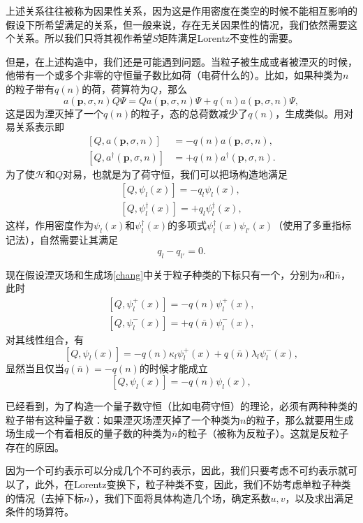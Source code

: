 \documentclass[9pt]{extbook}
\theoremstyle{plain}%
\begin{document}
上述关系往往被称为因果性关系，因为这是作用密度在类空的时候不能相互影响的假设下所希望满足的关系，但一般来说，存在无关因果性的情况，我们依然需要这个关系。所以我们只将其视作希望$S$矩阵满足Lorentz不变性的需要。

但是，在上述构造中，我们还是可能遇到问题。当粒子被生成或者被湮灭的时候，他带有一个或多个非零的守恒量子数比如荷（电荷什么的）。比如，如果种类为$n$的粒子带有$q(n)$的荷，荷算符为$Q$，那么
\[
	a(\mathbf{p},\sigma,n)Q\Psi=Qa(\mathbf{p},\sigma,n)\Psi+q(n)a(\mathbf{p},\sigma,n)\Psi,
\]
这是因为湮灭掉了一个$q(n)$的粒子，态的总荷数减少了$q(n)$，生成类似。用对易关系表示即
\[
\begin{split}
	[Q,a(\mathbf{p},\sigma,n)]&=-q(n)a(\mathbf{p},\sigma,n),\\
	[Q,a^\dag(\mathbf{p},\sigma,n)]&=+q(n)a^\dag(\mathbf{p},\sigma,n).
\end{split}
\]
为了使$\mathscr{H}$和$Q$对易，也就是为了荷守恒，我们可以把场构造地满足
\[
\begin{split}
	[Q,\psi_l(x)]=-q_l\psi_l(x),\\
	[Q,\psi^\dag_l(x)]=+q_l\psi^\dag_l(x),
\end{split}
\]
这样，作用密度作为$\psi_l(x)$和$\psi^\dag_l(x)$的多项式$\psi^\dag_l(x)\psi_{l'}(x)$（使用了多重指标记法），自然需要让其满足
\[
	q_{l}-q_{l'}=0.
\]

现在假设湮灭场和生成场\eqref{chang}中关于粒子种类的下标只有一个，分别为$n$和$\bar{n}$，此时
\[
\begin{split}
	[Q,\psi^+_l(x)]=-q(n)\psi^+_l(x),\\
	[Q,\psi^-_l(x)]=+q(\bar{n})\psi^-_l(x),
\end{split}
\]
对其线性组合，有
\[
	[Q,\psi_l(x)]=-q(n)\kappa_l\psi_l^+(x)+q(\bar{n})\lambda_l\psi_l^-(x),
\]
显然当且仅当$q(\bar{n})=-q(n)$的时候才能成立
\[
	[Q,\psi_l(x)]=-q(n)\psi_l(x),
\]


已经看到，为了构造一个量子数守恒（比如电荷守恒）的理论，必须有两种种类的粒子带有这种量子数：如果湮灭场湮灭掉了一个种类为$n$的粒子，那么就要用生成场生成一个有着相反的量子数的种类为$\bar{n}$的粒子（被称为反粒子）。这就是反粒子存在的原因。

因为一个可约表示可以分成几个不可约表示，因此，我们只要考虑不可约表示就可以了，此外，在Lorentz变换下，粒子种类不变，因此，我们不妨考虑单粒子种类的情况（去掉下标$n$），我们下面将具体构造几个场，确定系数$u,v$，以及求出满足条件的场算符。
\end{document}
